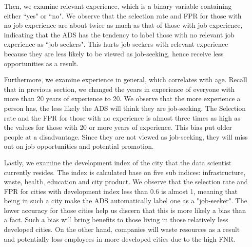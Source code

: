 Then, we examine relevant experience, which is a binary variable containing either ``yes" or ``no". We observe that the selection rate and FPR for those with no job experience are about twice as much as that of those with job experience, indicating that the ADS has the tendency to label those with no relevant job experience as ``job seekers". This hurts job seekers with relevant experience because they are less likely to be viewed as job-seeking, hence receive less opportunities as a result.

Furthermore, we examine experience in general, which correlates with age. Recall that in previous section, we changed the years in experience of everyone with more than 20 years of experience to 20. We observe that the more experience a person has, the less likely the ADS will think they are job-seeking. The Selection rate and the FPR for those with no experience is almost three times as high as the values for those with 20 or more years of experience. This bias put older people at a disadvantage. Since they are not viewed as job-seeking, they will miss out on job opportunities and potential promotion.

Lastly, we examine the development index of the city that the data scientist currently resides. The index is calculated base on five sub indices: infrastructure, waste, health, education and city product. We observe that the selection rate and FPR for cities with development index less than 0.6 is almost 1, meaning that being in such a city make the ADS automatically label one as a "job-seeker". The lower accuracy for those cities help us discern that this is more likely a bias than a fact. Such a bias will bring benefits to those living in those relatively less developed cities. On the other hand, companies will waste resources as a result and potentially loss employees in more developed cities due to the high FNR. 


